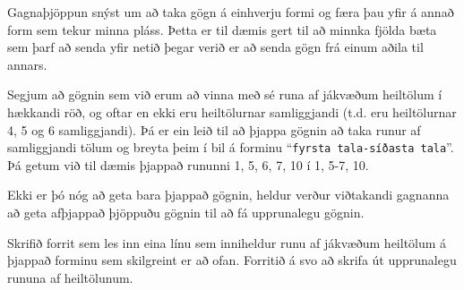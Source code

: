\begin{problem}
	Gagnaþjöppun snýst um að taka gögn á einhverju formi og færa þau yfir á annað form sem tekur minna pláss. Þetta er til dæmis gert til að minnka fjölda bæta sem þarf að senda yfir netið þegar verið er að senda gögn frá einum aðila til annars.

	Segjum að gögnin sem við erum að vinna með sé runa af jákvæðum heiltölum í hækkandi röð, og oftar en ekki eru heiltölurnar samliggjandi (t.d. eru heiltölurnar 4, 5 og 6 samliggjandi). Þá er ein leið til að þjappa gögnin að taka runur af samliggjandi tölum og breyta þeim í bil á forminu "`\texttt{fyrsta tala-síðasta tala}"'. Þá getum við til dæmis þjappað rununni 1, 5, 6, 7, 10 í 1, 5-7, 10.

	Ekki er þó nóg að geta bara þjappað gögnin, heldur verður viðtakandi gagnanna að geta afþjappað þjöppuðu gögnin til að fá upprunalegu gögnin.

	Skrifið forrit sem les inn eina línu sem inniheldur runu af jákvæðum heiltölum á þjappað forminu sem skilgreint er að ofan. Forritið á svo að skrifa út upprunalegu rununa af heiltölunum.

\begin{example}
%
\end{example}
\begin{example}
%
\end{example}
\begin{example}
%
\end{example}
\end{problem}